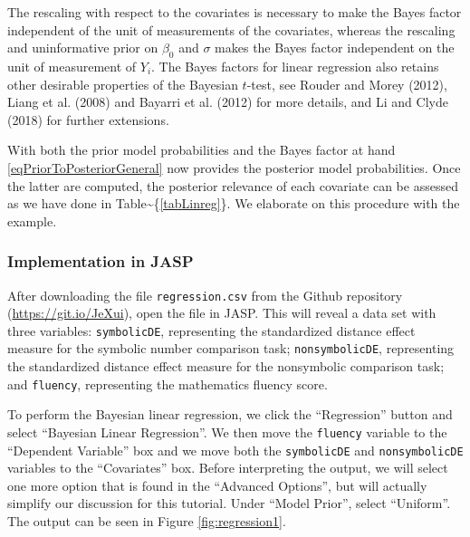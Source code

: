 \documentclass[english,,doc,floatsintext]{apa6}
\begin{document}
The rescaling with respect to the covariates is necessary to make the Bayes factor independent of the unit of measurements of the covariates, whereas the rescaling and uninformative prior on \(\beta_{0}\) and \(\sigma\) makes the Bayes factor independent on the unit of measurement of \(Y_{i}\). The Bayes factors for linear regression also retains other desirable properties of the Bayesian \(t\)-test, see Rouder and Morey (2012), Liang et al. (2008) and Bayarri et al. (2012) for more details, and Li and Clyde (2018) for further extensions.

With both the prior model probabilities and the Bayes factor at hand \eqref{eqPriorToPosteriorGeneral} now provides the posterior model probabilities. Once the latter are computed, the posterior relevance of each covariate can be assessed as we have done in Table\textasciitilde{}\{\ref{tabLinreg}\}. We elaborate on this procedure with the example.

\hypertarget{implementation-in-jasp-1}{%
\subsubsection{Implementation in JASP}\label{implementation-in-jasp-1}}

After downloading the file \texttt{regression.csv} from the Github repository (\url{https://git.io/JeXui}), open the file in JASP. This will reveal a data set with three variables: \texttt{symbolicDE}, representing the standardized distance effect measure for the symbolic number comparison task; \texttt{nonsymbolicDE}, representing the standardized distance effect measure for the nonsymbolic comparison task; and \texttt{fluency}, representing the mathematics fluency score.

To perform the Bayesian linear regression, we click the \enquote{Regression} button and select \enquote{Bayesian Linear Regression}. We then move the \texttt{fluency} variable to the \enquote{Dependent Variable} box and we move both the \texttt{symbolicDE} and \texttt{nonsymbolicDE} variables to the \enquote{Covariates} box. Before interpreting the output, we will select one more option that is found in the \enquote{Advanced Options}, but will actually simplify our discussion for this tutorial. Under \enquote{Model Prior}, select \enquote{Uniform}. The output can be seen in Figure \ref{fig:regression1}.
\end{document}
